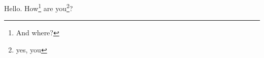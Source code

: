 \documentclass{article}
\begin{document}
Hello. How\footnote{And where?} are you\footnote{yes, you}?
\end{document}
